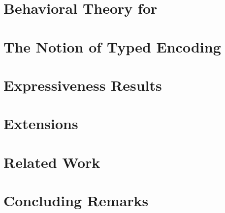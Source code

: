 \documentclass[runningheads]{llncs}
\begin{document}



\section{Behavioral Theory for \HOp}\label{sec:bt}


%



\section{The Notion of Typed Encoding}
\label{s:expr}


\section{Expressiveness Results}
\label{sec:positive}



\section{Extensions}
\label{sec:extension}





%

\section{Related Work}
\label{sec:relwork}


\section{Concluding Remarks}
\label{sec:concl}

\end{document}
